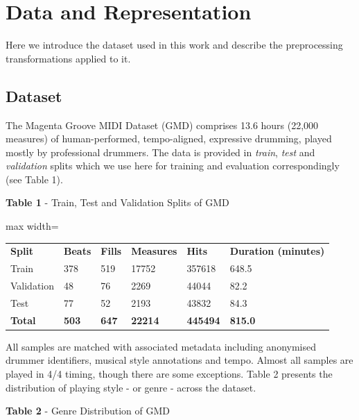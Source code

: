 \documentclass[sigconf]{nimeart}
\begin{document}
\section{Data and Representation}\label{data-and-representation}

Here we introduce the dataset used in this work and describe the preprocessing transformations applied to it.

\subsection{Dataset}\label{dataset}

The Magenta Groove MIDI Dataset (GMD) comprises 13.6 hours (22,000 measures) of human-performed, tempo-aligned, expressive drumming, played mostly by professional drummers. The data is provided in \emph{train}, \emph{test} and \emph{validation} splits which we use here for training and evaluation correspondingly (see Table 1).

\textbf{Table 1} - Train, Test and Validation Splits of GMD

{\def\LTcaptype{none} %
\begin{table}[htbp]\centering\small
\begin{adjustbox}{max width=\textwidth}\begin{tabular}{llllll}
\toprule\noalign{}
\midrule
\textbf{Split} & \textbf{Beats} & \textbf{Fills} & \textbf{Measures} & \textbf{Hits} & \textbf{Duration (minutes)} \\
Train & 378 & 519 & 17752 & 357618 & 648.5 \\
Validation & 48 & 76 & 2269 & 44044 & 82.2 \\
Test & 77 & 52 & 2193 & 43832 & 84.3 \\
\textbf{Total} & \textbf{503} & \textbf{647} & \textbf{22214} & \textbf{445494} & \textbf{815.0} \\
\bottomrule
\end{tabular}\end{adjustbox}\end{table}
}

All samples are matched with associated metadata including anonymised drummer identifiers, musical style annotations and tempo. Almost all samples are played in 4/4 timing, though there are some exceptions. Table 2 presents the distribution of playing style - or genre - across the dataset.

\textbf{Table 2} - Genre Distribution of GMD
\end{document}
